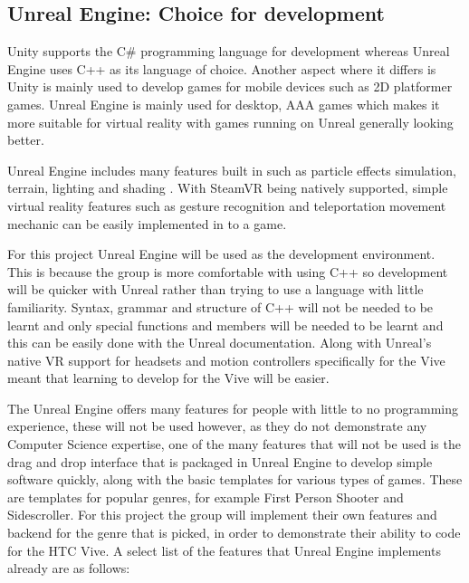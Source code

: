 \subsection{Unreal Engine: Choice for development}
Unity supports the C\# programming language for development whereas Unreal Engine uses C++ as its language of choice. Another aspect where it differs is Unity is mainly used to develop games for mobile devices such as 2D platformer games. Unreal Engine is mainly used for desktop, AAA games which makes it more suitable for virtual reality with games running on Unreal generally looking better.
\newline
\par
Unreal Engine includes many features built in such as particle effects simulation, terrain, lighting and shading \cite{unrealfeatures}. With SteamVR being natively supported, simple virtual reality features such as gesture recognition and teleportation movement mechanic can be easily implemented in to a game.
\newline
\par
For this project Unreal Engine will be used as the development environment. This is because the group is more comfortable with using C++ so development will be quicker with Unreal rather than trying to use a language with little familiarity. Syntax, grammar and structure of C++ will not be needed to be learnt and only special functions and members will be needed to be learnt and this can be easily done with the Unreal documentation. Along with Unreal's native VR support for headsets and motion controllers specifically for the Vive meant that learning to develop for the Vive will be easier.
\newline
\par
The Unreal Engine offers many features for people with little to no programming experience, these will not be used however, as they do not demonstrate any Computer Science expertise, one of the many features that will not be used is the drag and drop interface that is packaged in Unreal Engine to develop simple software quickly, along with the basic templates for various types of games. These are templates for popular genres, for example First Person Shooter and Sidescroller. For this project the group will implement their own features and backend for the genre that is picked, in order to demonstrate their ability to code for the HTC Vive. A select list of the features that Unreal Engine implements already are as follows:

